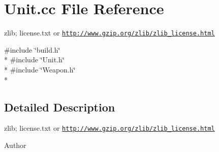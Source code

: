 \section{Unit.\-cc File Reference}
\label{_unit_8cc}


zlib; license.\-txt or \href{http://www.gzip.org/zlib/zlib_license.html}{\tt http\-://www.\-gzip.\-org/zlib/zlib\-\_\-license.\-html}  


{\ttfamily \#include \char`\"{}build.\-h\char`\"{}}\\*
{\ttfamily \#include \char`\"{}Unit.\-h\char`\"{}}\\*
{\ttfamily \#include \char`\"{}Weapon.\-h\char`\"{}}\\*


\subsection{Detailed Description}
zlib; license.\-txt or \href{http://www.gzip.org/zlib/zlib_license.html}{\tt http\-://www.\-gzip.\-org/zlib/zlib\-\_\-license.\-html} \begin{DoxyAuthor}{Author}

\end{DoxyAuthor}
